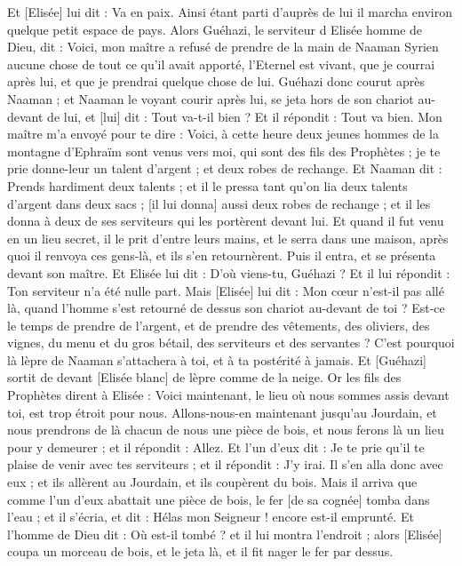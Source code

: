 \begin{multicols}{2}
Et [Elisée] lui dit : Va en paix. Ainsi étant parti d'auprès de lui il marcha environ quelque petit espace de pays.
Alors Guéhazi, le serviteur d Elisée homme de Dieu, dit : Voici, mon maître a refusé de prendre de la main de Naaman Syrien aucune chose de tout ce qu'il avait apporté, l'Eternel est vivant, que je courrai après lui, et que je prendrai quelque chose de lui.
Guéhazi donc courut après Naaman ; et Naaman le voyant courir après lui, se jeta hors de son chariot au-devant de lui, et [lui] dit : Tout va-t-il bien ?
Et il répondit : Tout va bien. Mon maître m'a envoyé pour te dire : Voici, à cette heure deux jeunes hommes de la montagne d'Ephraïm sont venus vers moi, qui sont des fils des Prophètes ; je te prie donne-leur un talent d'argent ; et deux robes de rechange.
Et Naaman dit : Prends hardiment deux talents ; et il le pressa tant qu'on lia deux talents d'argent dans deux sacs ; [il lui donna] aussi deux robes de rechange ; et il les donna à deux de ses serviteurs qui les portèrent devant lui.
Et quand il fut venu en un lieu secret, il le prit d'entre leurs mains, et le serra dans une maison, après quoi il renvoya ces gens-là, et ils s'en retournèrent.
Puis il entra, et se présenta devant son maître. Et Elisée lui dit : D'où viens-tu, Guéhazi ? Et il lui répondit : Ton serviteur n'a été nulle part.
Mais [Elisée] lui dit : Mon cœur n'est-il pas allé là, quand l'homme s'est retourné de dessus son chariot au-devant de toi ? Est-ce le temps de prendre de l'argent, et de prendre des vêtements, des oliviers, des vignes, du menu et du gros bétail, des serviteurs et des servantes ?
C'est pourquoi là lèpre de Naaman s'attachera à toi, et à ta postérité à jamais. Et [Guéhazi] sortit de devant [Elisée blanc] de lèpre comme de la neige.
\VerseOne{}Or les fils des Prophètes dirent à Elisée : Voici maintenant, le lieu où nous sommes assis devant toi, est trop étroit pour nous.
Allons-nous-en maintenant jusqu'au Jourdain, et nous prendrons de là chacun de nous une pièce de bois, et nous ferons là un lieu pour y demeurer ; et il répondit : Allez.
Et l'un d'eux dit : Je te prie qu'il te plaise de venir avec tes serviteurs ; et il répondit : J'y irai.
Il s'en alla donc avec eux ; et ils allèrent au Jourdain, et ils coupèrent du bois.
Mais il arriva que comme l'un d'eux abattait une pièce de bois, le fer [de sa cognée] tomba dans l'eau ; et il s'écria, et dit : Hélas mon Seigneur ! encore est-il emprunté.
Et l'homme de Dieu dit : Où est-il tombé ? et il lui montra l'endroit ; alors [Elisée] coupa un morceau de bois, et le jeta là, et il fit nager le fer par dessus.

\end{multicols}
